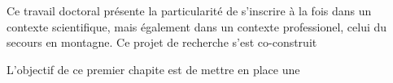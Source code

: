 

Ce travail doctoral présente la particularité de s'inscrire à la fois
dans un contexte scientifique, mais également dans un contexte
professionel, celui du secours en montagne. Ce projet de recherche
s'est co-construit

L'objectif de ce premier chapite est de mettre en place une 